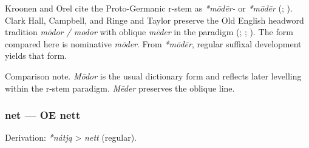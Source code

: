 \documentclass[
  british,
  a4paper,
]{article}
\begin{document}
Kroonen and Orel cite the Proto-Germanic r-stem as \emph{*mōdēr-} or
\emph{*mōdēr} (;
). Clark Hall, Campbell, and
Ringe and Taylor preserve the Old English headword tradition \emph{mōdor
/ modor} with oblique \emph{mēder} in the paradigm
(;
;
). The form
compared here is nominative \emph{mōder}. From \emph{*mōdēr}, regular
suffixal development yields that form.

Comparison note. \emph{Mōdor} is the usual dictionary form and reflects
later levelling within the r-stem paradigm. \emph{Mēder} preserves the
oblique line.

\subsubsection{net --- OE nett}\label{net-oe-nett}

Derivation: \emph{*nátją} \textgreater{} \emph{nett} (regular).

\begingroup
\setlength{\fboxsep}{6pt}
\end{document}
